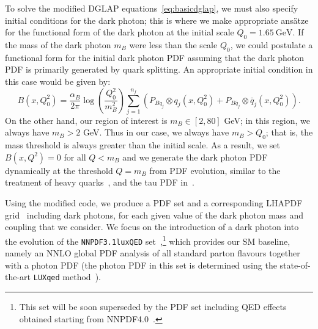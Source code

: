 \documentclass[withindex,glossary]{cam-thesis}
\begin{document}
To solve the modified DGLAP equations~\eqref{eq:basicdglap}, we must
also specify initial conditions for the dark photon;
this is where we make appropriate ans\"{a}tze for the functional form of the dark photon at the initial scale $Q_0 = 1.65\ \text{GeV}$. 
If the mass of the dark photon $m_B$ were less than the scale $Q_0$, we
could postulate a functional form for the initial dark photon PDF
assuming that the dark photon PDF is primarily generated by quark
splitting.
An appropriate initial condition in this case would be given by:
\begin{equation}
\label{eq:lowmassansatz}
B(x,Q_0^2) = \frac{\alpha_B}{2\pi} \log\left( \frac{Q_0^2}{m_B^2} \right) \sum_{j=1}^{n_f} \left(P_{Bq_j} \otimes q_j(x,Q_0^2)+ P_{B\overline{q}_j} \otimes \bar{q}_j(x,Q_0^2) \right).
\end{equation}
On the other hand, our region of interest is $m_B \in [2,80]$ GeV;
in this region, we always have $m_B >
2$ GeV. Thus in our case, we always have $m_B > Q_0$; that is, the mass threshold is always greater than
the initial scale. As a result, we set $B(x,Q^2) = 0$ for all $Q < m_B$ and we generate the dark photon PDF dynamically at the threshold $Q = m_B$ from PDF evolution, similar to the treatment of heavy quarks~\cite{Maltoni:2012pa,Bertone:2017djs}, and the tau PDF in~\cite{Bertone:2015lqa}. 



Using the modified code, we produce a PDF set and a corresponding LHAPDF
grid~\cite{Buckley:2014ana} including dark photons, for each given
value of the dark photon mass and coupling that we consider. 
We focus on the introduction of a dark photon into the evolution of the
{\tt NNPDF3.1luxQED} set~\cite{Bertone:2017bme},\footnote{This
    set will be soon superseded by the PDF set including QED effects
    obtained starting from NNPDF4.0~\cite{NNPDF:2021njg}.} which provides our
SM baseline, namely an NNLO
global PDF analysis of all standard parton flavours together with a photon PDF (the photon
PDF in this set is determined using the state-of-the-art {\tt LUXqed}
method~\cite{Manohar:2017eqh}).\\
\end{document}
